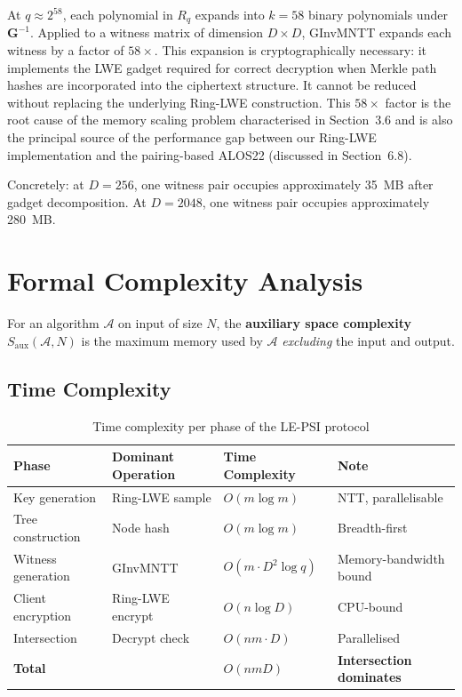 \begin{remark}\label{rem:gadget-cost}
At $q \approx 2^{58}$, each polynomial in $R_q$ expands into $k = 58$ binary polynomials
under $\mathbf{G}^{-1}$. Applied to a witness matrix of dimension $D \times D$, GInvMNTT
expands each witness by a factor of $58\times$. This expansion is cryptographically necessary:
it implements the LWE gadget required for correct decryption when Merkle path hashes are
incorporated into the ciphertext structure. It cannot be reduced without replacing the
underlying Ring-LWE construction. This $58\times$ factor is the root cause of the memory
scaling problem characterised in Section~3.6 and is also the principal source of the
performance gap between our Ring-LWE implementation and the pairing-based ALOS22 (discussed in Section~6.8).

Concretely: at $D = 256$, one witness pair occupies approximately 35~MB after gadget decomposition.
At $D = 2048$, one witness pair occupies approximately 280~MB.
\end{remark}

\section{Formal Complexity Analysis}

\begin{definition}\label{def:auxspace}
For an algorithm $\mathcal{A}$ on input of size $N$, the
\textbf{auxiliary space complexity} $S_{\text{aux}}(\mathcal{A}, N)$ is the
maximum memory used by $\mathcal{A}$ \textit{excluding} the input and output.
\end{definition}

\subsection{Time Complexity}

\begin{table}[H]
\centering
\caption{Time complexity per phase of the LE-PSI protocol}
\label{tab:time-complexity}
\begin{tabular}{@{}llll@{}}
\toprule
\textbf{Phase} & \textbf{Dominant Operation} & \textbf{Time Complexity} & \textbf{Note} \\
\midrule
Key generation     & Ring-LWE sample  & $O(m \log m)$ & NTT, parallelisable \\
Tree construction  & Node hash     & $O(m \log m)$ & Breadth-first \\
Witness generation & GInvMNTT     & $O(m \cdot D^2 \log q)$ & Memory-bandwidth bound \\
Client encryption  & Ring-LWE encrypt & $O(n \log D)$ & CPU-bound \\
Intersection       & Decrypt check & $O(nm \cdot D)$ & Parallelised \\
\midrule
\textbf{Total} & & \textbf{$O(nmD)$} & \textbf{Intersection dominates} \\
\bottomrule
\end{tabular}
\end{table}

